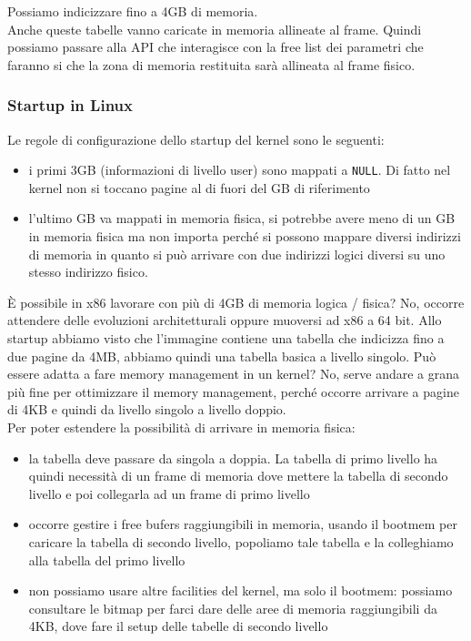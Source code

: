 \documentclass[12pt, oneside]{extbook}
\begin{document}
Possiamo indicizzare fino a 4GB di memoria.\\Anche queste tabelle vanno caricate in memoria allineate al frame. Quindi possiamo passare alla API che interagisce con la free list dei parametri che faranno si che la zona di memoria restituita sarà allineata al frame fisico.
\subsubsection{Startup in Linux}
Le regole di configurazione dello startup del kernel sono le seguenti:
\begin{itemize}
\item i primi 3GB (informazioni di livello user) sono mappati a \texttt{NULL}. Di fatto nel kernel non si toccano pagine al di fuori del GB di riferimento
\item l'ultimo GB va mappati in memoria fisica, si potrebbe avere meno di un GB in memoria fisica ma non importa perché si possono mappare diversi indirizzi di memoria in quanto si può arrivare con due indirizzi logici diversi su uno stesso indirizzo fisico.
\end{itemize}
È possibile in x86 lavorare con più di 4GB di memoria logica / fisica? No, occorre attendere delle evoluzioni architetturali oppure muoversi ad x86 a 64 bit. Allo startup abbiamo visto che l'immagine contiene una tabella che indicizza fino a due pagine da 4MB, abbiamo quindi una tabella basica a livello singolo. Può essere adatta a fare memory management in un kernel? No, serve andare a grana più fine per ottimizzare il memory management, perché occorre arrivare a pagine di 4KB e quindi da livello singolo a livello doppio.\\ Per poter estendere la possibilità di arrivare in memoria fisica:
\begin{itemize}
\item la tabella deve passare da singola a doppia. La tabella di primo livello ha quindi necessità di un frame di memoria dove mettere la tabella di secondo livello e poi collegarla ad un frame di primo livello
\item occorre gestire i free bufers raggiungibili in memoria, usando il bootmem per caricare la tabella di secondo livello, popoliamo tale tabella e la colleghiamo alla tabella del primo livello
\item non possiamo usare altre facilities del kernel, ma solo il bootmem: possiamo consultare le bitmap per farci dare delle aree di memoria raggiungibili da 4KB, dove fare il setup delle tabelle di secondo livello
\end{itemize}
\end{document}
